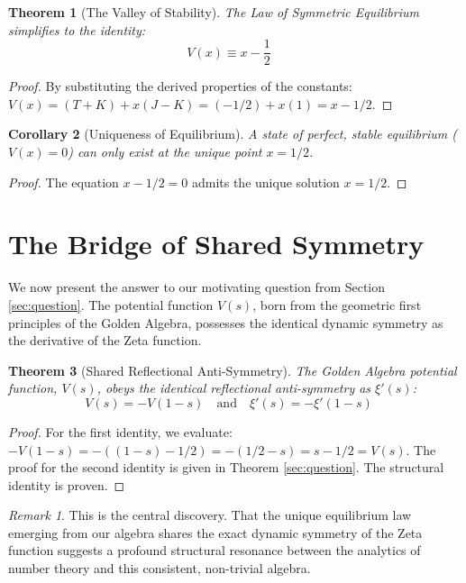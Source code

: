 \documentclass{article}
\theoremstyle{plain}
\newtheorem{theorem}{Theorem}[section]
\newtheorem{corollary}[theorem]{Corollary}
\theoremstyle{definition}
\theoremstyle{remark}
\newtheorem*{remark}{Remark}
\begin{document}
\begin{theorem}[The Valley of Stability]
The Law of Symmetric Equilibrium simplifies to the identity:
$$ V(x) \equiv x - \frac{1}{2} \quad \text{}$$
\end{theorem}
\begin{proof}
By substituting the derived properties of the constants:
$V(x) = (T+K) + x(J-K) = (-1/2) + x(1) = x - 1/2$.
\end{proof}

\begin{corollary}[Uniqueness of Equilibrium]
A state of perfect, stable equilibrium ($V(x)=0$) can only exist at the unique point $x=1/2$.
\end{corollary}
\begin{proof}
The equation $x - 1/2 = 0$ admits the unique solution $x=1/2$.
\end{proof}

\section{The Bridge of Shared Symmetry}
\label{sec:bridge}
We now present the answer to our motivating question from Section \ref{sec:question}. The potential function $V(s)$, born from the geometric first principles of the Golden Algebra, possesses the identical dynamic symmetry as the derivative of the Zeta function.

\begin{theorem}[Shared Reflectional Anti-Symmetry]
The Golden Algebra potential function, $V(s)$, obeys the identical reflectional anti-symmetry as $\xi'(s)$:
$$ V(s) = -V(1-s) \quad \text{and} \quad \xi'(s) = -\xi'(1-s) \quad \text{}$$
\end{theorem}
\begin{proof}
For the first identity, we evaluate: $-V(1-s) = -((1-s) - 1/2) = -(1/2 - s) = s - 1/2 = V(s)$. The proof for the second identity is given in Theorem \ref{sec:question}. The structural identity is proven.
\end{proof}

\begin{remark}
This is the central discovery. That the unique equilibrium law emerging from our algebra shares the exact dynamic symmetry of the Zeta function suggests a profound structural resonance between the analytics of number theory and this consistent, non-trivial algebra.
\end{remark}

\end{document}
